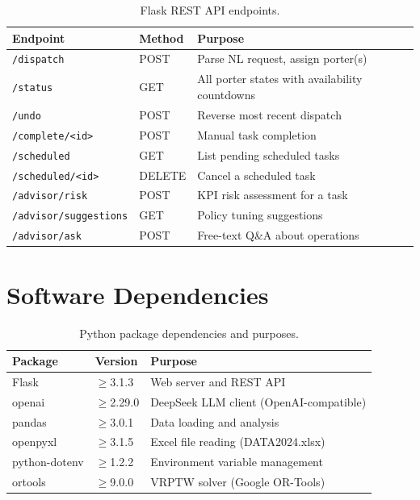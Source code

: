 \documentclass[12pt,a4paper]{article}
\begin{document}
\begin{table}[H]
\centering
\caption{Flask REST API endpoints.}
\begin{tabular}{lll}
\toprule
\textbf{Endpoint} & \textbf{Method} & \textbf{Purpose} \\
\midrule
\texttt{/dispatch}             & POST   & Parse NL request, assign porter(s) \\
\texttt{/status}               & GET    & All porter states with availability countdowns \\
\texttt{/undo}                 & POST   & Reverse most recent dispatch \\
\texttt{/complete/<id>}        & POST   & Manual task completion \\
\texttt{/scheduled}            & GET    & List pending scheduled tasks \\
\texttt{/scheduled/<id>}       & DELETE & Cancel a scheduled task \\
\texttt{/advisor/risk}         & POST   & KPI risk assessment for a task \\
\texttt{/advisor/suggestions}  & GET    & Policy tuning suggestions \\
\texttt{/advisor/ask}          & POST   & Free-text Q\&A about operations \\
\bottomrule
\end{tabular}
\end{table}

\section{Software Dependencies}

\begin{table}[H]
\centering
\caption{Python package dependencies and purposes.}
\begin{tabular}{lll}
\toprule
\textbf{Package} & \textbf{Version} & \textbf{Purpose} \\
\midrule
Flask         & $\geq$3.1.3  & Web server and REST API \\
openai        & $\geq$2.29.0 & DeepSeek LLM client (OpenAI-compatible) \\
pandas        & $\geq$3.0.1  & Data loading and analysis \\
openpyxl      & $\geq$3.1.5  & Excel file reading (DATA2024.xlsx) \\
python-dotenv & $\geq$1.2.2  & Environment variable management \\
ortools       & $\geq$9.0.0  & VRPTW solver (Google OR-Tools) \\
\bottomrule
\end{tabular}
\end{table}
\end{document}
